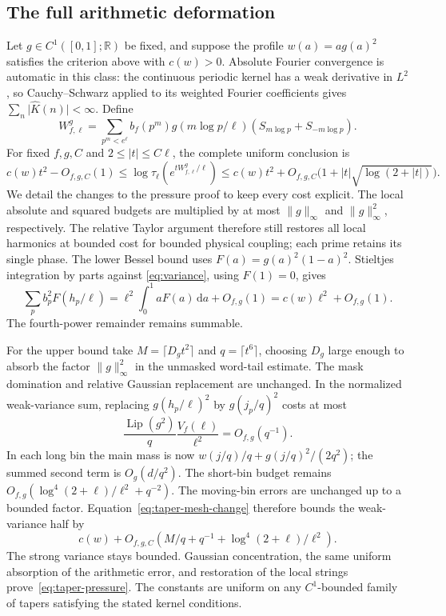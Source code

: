 \documentclass[11pt,reqno]{amsart}
\numberwithin{equation}{section}
\newcommand{\R}{\mathbb R}
\newcommand{\dd}{\,\mathrm d}
\newcommand{\norm}[1]{\lVert#1\rVert}
\newcommand{\abs}[1]{\lvert#1\rvert}
\begin{document}
\subsection*{The full arithmetic deformation}

Let $g\in C^1([0,1];\R)$ be fixed, and suppose the profile
$w(a)=ag(a)^2$ satisfies the criterion above with $c(w)>0$.
Absolute Fourier convergence is automatic in this class:
the continuous periodic kernel has a weak derivative in $L^2$,
so Cauchy--Schwarz applied to its weighted Fourier coefficients
gives $\sum_n\abs{\widehat K(n)}<\infty$.
Define
\begin{equation}\label{eq:taper-operator}
 W_{f,\ell}^g=\sum_{p^m<e^\ell}b_f(p^m)g(m\log p/\ell)
                           (S_{m\log p}+S_{-m\log p}).
\end{equation}
For fixed $f,g,C$ and $2\le\abs t\le C\ell$, the complete
uniform conclusion is
\begin{equation}\label{eq:taper-pressure}
 c(w)t^2-O_{f,g,C}(1)
 \le\log\tau_\ell(e^{tW_{f,\ell}^g/\ell})
 \le c(w)t^2+O_{f,g,C}\bigl(1+\abs t\sqrt{\log(2+\abs t)}\bigr).
\end{equation}
We detail the changes to the pressure proof to keep every cost
explicit. The local absolute and squared budgets are multiplied
by at most $\norm g_\infty$ and $\norm g_\infty^2$,
respectively. The relative Taylor argument therefore still
restores all local harmonics at bounded cost for bounded
physical coupling; each prime retains its single phase.
The lower Bessel bound uses
$F(a)=g(a)^2(1-a)^2$. Stieltjes integration by parts against
\eqref{eq:variance}, using $F(1)=0$, gives
\[
 \sum_pb_p^2F(h_p/\ell)=\ell^2\int_0^1aF(a)\dd a+O_{f,g}(1)
                         =c(w)\ell^2+O_{f,g}(1).
\]
The fourth-power remainder remains summable.

For the upper bound take $M=\lceil D_gt^2\rceil$ and
$q=\lceil t^6\rceil$, choosing $D_g$ large enough to
absorb the factor $\norm g_\infty^2$ in the unmasked
word-tail estimate. The mask domination and relative Gaussian
replacement are unchanged. In the normalized weak-variance sum,
replacing $g(h_p/\ell)^2$ by $g(j_p/q)^2$ costs at most
\[
 \frac{\operatorname{Lip}(g^2)}q\frac{V_f(\ell)}{\ell^2}
                              =O_{f,g}(q^{-1}).
\]
In each long bin the main mass is now
$w(j/q)/q+g(j/q)^2/(2q^2)$; the summed second term is
$O_g(d/q^2)$. The short-bin budget remains
$O_{f,g}(\log^4(2+\ell)/\ell^2+q^{-2})$.
The moving-bin errors are unchanged up to a bounded factor.
Equation~\eqref{eq:taper-mesh-change} therefore bounds the
weak-variance half by
\[
 c(w)+O_{f,g,C}\left(M/q+q^{-1}
                              +\log^4(2+\ell)/\ell^2\right).
\]
The strong variance stays bounded. Gaussian concentration,
the same uniform absorption of the arithmetic error, and
restoration of the local strings prove~\eqref{eq:taper-pressure}.
The constants are uniform on any $C^1$-bounded family of
tapers satisfying the stated kernel conditions.
\end{document}
